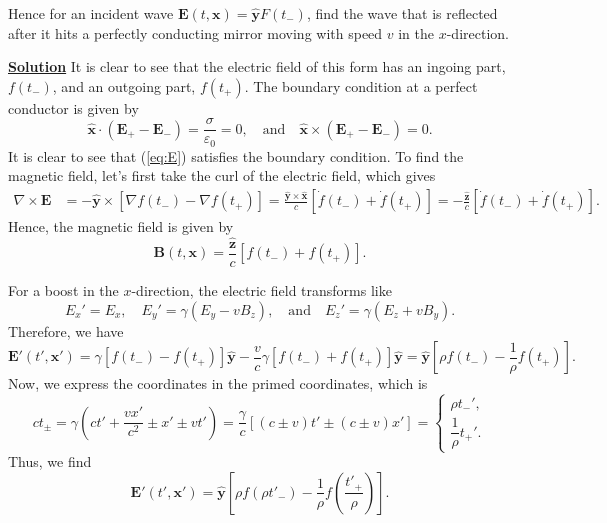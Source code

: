 Hence for an incident wave $\mathbf{E}(t,\mathbf{x}) = \hat{\mathbf{y}}F(t_-)$,
find the wave that is reflected after it hits a perfectly conducting mirror
moving with speed $v$ in the $x$-direction.

\noindent \underline{\textbf{Solution}} It is clear to see that the electric field of this form has an ingoing part, $f(t_-)$, and an outgoing part, $f(t_+)$. The boundary condition at a perfect conductor is given by 
\begin{equation}
    \hat{\mathbf{x}}\cdot (\mathbf{E}_+- \mathbf{E}_-) = \frac{\sigma}{\varepsilon_0} = 0, \quad \text{and}\quad \hat{\mathbf{x}}\times(\mathbf{E}_+- \mathbf{E}_-) =0.
\end{equation}
It is clear to see that (\ref{eq:E}) satisfies the boundary condition. To find the magnetic field, let's first take the curl of the electric field, which gives
\begin{align}
    \nabla \times \mathbf{E} &= -\hat{\mathbf{y}} \times[\nabla f(t_-) - \nabla f(t_+)] = \frac{\hat{\mathbf{y}}\times \hat{\mathbf{x}}}{c}[\dot{f}(t_-) + \dot{f}(t_+)]= -\frac{\hat{\mathbf{z}}}{c}[\dot{f}(t_-) + \dot{f}(t_+)].
\end{align}
Hence, the magnetic field is given by
\begin{equation}
    \mathbf{B}(t,\mathbf{x}) = \frac{\hat{\mathbf{z}}}{c} [f(t_-) + f(t_+)].
\end{equation}

For a boost in the $x$-direction, the electric field transforms like
\begin{equation}
    E_x'= E_x, \quad E_y' = \gamma(E_y-vB_z),\quad \text{and}\quad E_z'=\gamma(E_z+vB_y).
\end{equation}
Therefore, we have
\begin{equation}
    \mathbf{E}'(t',\mathbf{x}') = \gamma[f(t_-)-f(t_+)]\hat{\mathbf{y}}-\frac{v}{c}\gamma[f(t_-)+f(t_+)]\hat{\mathbf{y}} = \hat{\mathbf{y}}[\rho f(t_-) -\frac{1}{\rho}f(t_+)].
\end{equation}
Now, we express the coordinates in the primed coordinates, which is
\begin{equation}
    ct_\pm = \gamma\left(ct'+\frac{vx'}{c^2}\pm x' \pm vt'\right) = \frac{\gamma}{c}\left[(c\pm v)t' \pm(c\pm v)x'\right]=\begin{cases}
        \rho t_-',\\
        \dfrac{1}{\rho}t_+'.
    \end{cases}
\end{equation}
Thus, we find
\begin{equation}
  \mathbf{E}'(t',\mathbf{x}') = \hat{\mathbf{y}}\left[
    \rho f(\rho t'_-) - \frac{1}{\rho}f\!\left(\frac{t'_+}{\rho}\right)
  \right].
\end{equation}

